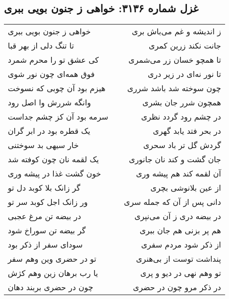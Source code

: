 \begin{center}
\section*{غزل شماره ۳۱۳۶: خواهی ز جنون بویی ببری}
\label{sec:3136}
\begin{longtable}{l p{0.5cm} r}
خواهی ز جنون بویی ببری
&&
ز اندیشه و غم می‌باش بری
\\
تا تنگ دلی از بهر قبا
&&
جانت نکند زرین کمری
\\
کی عشق تو را محرم شمرد
&&
تا همچو خسان زر می‌شمری
\\
فوق همه‌ای چون نور شوی
&&
تا نور نه‌ای در زیر دری
\\
هیزم بود آن چوبی که نسوخت
&&
چون سوخته شد باشد شرری
\\
وانگه شررش وا اصل رود
&&
همچون شرر جان بشری
\\
سرمه بود آن کز چشم جداست
&&
در چشم رود گردد نظری
\\
یک قطره بود در ابر گران
&&
در بحر فتد یابد گهری
\\
خار سیهی بد سوختنی
&&
گردش گل تر باد سحری
\\
یک لقمه نان چون کوفته شد
&&
جان گشت و کند نان جانوری
\\
خون گشت غذا در پیشه وری
&&
آن لقمه کند هم پیشه وری
\\
گر زانک بلا کوبد دل تو
&&
از عین بلانوشی بچری
\\
ور زانک اجل کوبد سر تو
&&
دانی پس از آن که جمله سری
\\
در بیضه تن مرغ عجبی
&&
در بیضه دری ز آن می‌نپری
\\
گر بیضه تن سوراخ شود
&&
هم پر بزنی هم جان ببری
\\
سودای سفر از ذکر بود
&&
از ذکر شود مردم سفری
\\
تو در حضری وین وهم سفر
&&
پنداشت توست از بی‌هنری
\\
یا رب برهان زین وهم کژش
&&
تو وهم نهی در دیو و پری
\\
چون در حضری بربند دهان
&&
در ذکر مرو چون در حضری
\\
\end{longtable}
\end{center}
